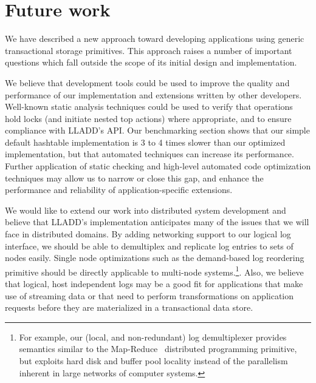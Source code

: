 \documentclass[10pt,letterpaper,twocolumn,english]{article}
\newcommand{\yad}{LLADD\xspace}
\begin{document}
\section{Future work}

We have described a new approach toward developing applications using
generic transactional storage primitives.  This approach raises a
number of important questions which fall outside the scope of its
initial design and implementation.


We believe that development tools could be used to
improve the quality and performance of our implementation and
extensions written by other developers.  Well-known static analysis
techniques could be used to verify that operations hold locks (and
initiate nested top actions) where appropriate, and to ensure
compliance with \yad's API.  Our benchmarking section shows that our simple default
hashtable implementation is 3 to 4 times slower than our optimized
implementation, but that automated techniques can increase its performance.
  Further application of static checking and high-level automated code
optimization techniques may allow us to narrow or close this
gap, and enhance the performance and reliability of application-specific 
extensions.

We would like to extend our work into distributed system
development and believe that \yad's implementation anticipates many
of the issues that we will face in distributed domains.  By adding 
networking support to our logical log interface,
we should be able to demultiplex and replicate log entries to sets of
nodes easily.  Single node optimizations such as the demand-based log
reordering primitive should be directly applicable to multi-node
systems.\footnote{For example, our (local, and non-redundant) log
demultiplexer provides semantics similar to the
Map-Reduce~\cite{mapReduce} distributed programming primitive, but
exploits hard disk and buffer pool locality instead of the parallelism
inherent in large networks of computer systems.}.  Also, we believe
that logical, host independent logs may be a good fit for applications
that make use of streaming data or that need to perform
transformations on application requests before they are materialized
in a transactional data store.
\end{document}
